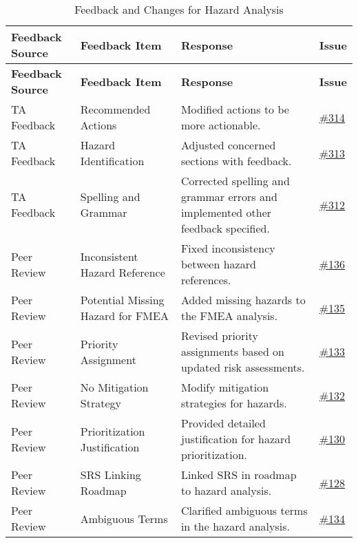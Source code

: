\documentclass{article}
\begin{document}
\begin{longtable}{| p{} | p{} | p{} | p{} |}
    \caption{Feedback and Changes for Hazard Analysis} \\
    \hline
    \textbf{Feedback Source} & \textbf{Feedback Item} & \textbf{Response} & \textbf{Issue} \\
    \hline
    \endfirsthead
    \hline
    \textbf{Feedback Source} & \textbf{Feedback Item} & \textbf{Response} & \textbf{Issue} \\
    \hline
    \endhead
    \hline
    \endfoot
    TA Feedback & Recommended Actions & Modified actions to be more actionable. & \href{https://github.com/TPGEngine/tpg/issues/314}{\#314} \\
    \hline
    TA Feedback & Hazard Identification & Adjusted concerned sections with feedback. & \href{https://github.com/TPGEngine/tpg/issues/313}{\#313} \\
    \hline
    TA Feedback & Spelling and Grammar & Corrected spelling and grammar errors and implemented other feedback specified. & \href{https://github.com/TPGEngine/tpg/issues/312}{\#312} \\
    \hline
    Peer Review & Inconsistent Hazard Reference & Fixed inconsistency between hazard references. & \href{https://github.com/TPGEngine/tpg/issues/136}{\#136} \\
    \hline
    Peer Review & Potential Missing Hazard for FMEA & Added missing hazards to the FMEA analysis. & \href{https://github.com/TPGEngine/tpg/issues/135}{\#135} \\
    \hline
    Peer Review & Priority Assignment & Revised priority assignments based on updated risk assessments. & \href{https://github.com/TPGEngine/tpg/issues/133}{\#133} \\
    \hline
    Peer Review & No Mitigation Strategy & Modify mitigation strategies for hazards. & \href{https://github.com/TPGEngine/tpg/issues/132}{\#132} \\
    \hline
    Peer Review & Prioritization Justification & Provided detailed justification for hazard prioritization. & \href{https://github.com/TPGEngine/tpg/issues/130}{\#130} \\
    \hline
    Peer Review & SRS Linking Roadmap & Linked SRS in roadmap to hazard analysis. & \href{https://github.com/TPGEngine/tpg/issues/128}{\#128} \\
    \hline
    Peer Review & Ambiguous Terms & Clarified ambiguous terms in the hazard analysis. & \href{https://github.com/TPGEngine/tpg/issues/134}{\#134} \\
    \hline
\end{longtable}
\end{document}

